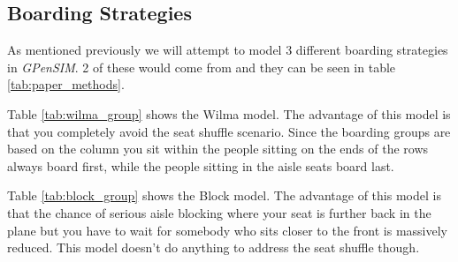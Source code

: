 \documentclass[english]{article}
\begin{document}
\subsection{Boarding Strategies}
As mentioned previously we will attempt to model 3 different boarding strategies in \emph{GPenSIM}. 2 of these would come from  and they can be seen in table \ref{tab:paper_methods}. 

Table \ref{tab:wilma_group} shows the Wilma model. The advantage of this model is that you completely avoid the seat shuffle scenario. Since the boarding groups are based on the column you sit within the people sitting on the ends of the rows always board first, while the people sitting in the aisle seats board last.

Table \ref{tab:block_group} shows the Block model. The advantage of this model is that the chance of serious aisle blocking where your seat is further back in the plane but you have to wait for somebody who sits closer to the front is massively reduced. This model doesn't do anything to address the seat shuffle though.
\end{document}

